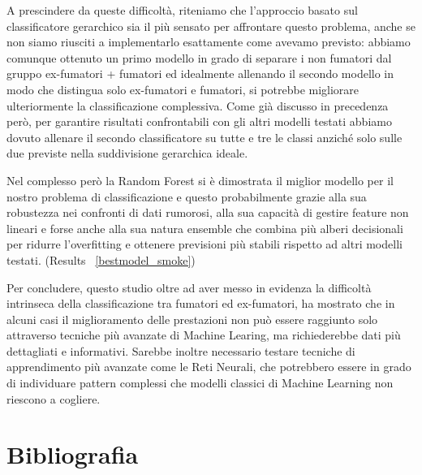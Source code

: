 \documentclass{article}
\begin{document}
\begin{multicols}{2}
A prescindere da queste difficoltà, riteniamo che l’approccio basato sul classificatore gerarchico sia il più sensato per affrontare questo problema, anche se non siamo riusciti a implementarlo esattamente come avevamo previsto: abbiamo comunque ottenuto un primo modello in grado di separare i non fumatori dal gruppo ex-fumatori + fumatori ed idealmente allenando il secondo modello in modo che distingua solo ex-fumatori e fumatori, si potrebbe migliorare ulteriormente la classificazione complessiva.
Come già discusso in precedenza però, per garantire risultati confrontabili con gli altri modelli testati abbiamo dovuto allenare il secondo classificatore su tutte e tre le classi anziché solo sulle due previste nella suddivisione gerarchica ideale.

Nel complesso però la Random Forest si è dimostrata il miglior modello per il nostro problema di classificazione e questo probabilmente grazie alla sua robustezza nei confronti di dati rumorosi, alla sua capacità di gestire feature non lineari e forse anche alla sua natura ensemble che combina più alberi decisionali per ridurre l’overfitting e ottenere previsioni più stabili rispetto ad altri modelli testati. (Results ~\ref{bestmodel_smoke})

Per concludere, questo studio oltre ad aver messo in evidenza la difficoltà intrinseca della classificazione tra fumatori ed ex-fumatori, ha mostrato che in alcuni casi il miglioramento delle prestazioni non può essere raggiunto solo attraverso tecniche più avanzate di Machine Learing, ma richiederebbe dati più dettagliati e informativi.
Sarebbe inoltre necessario testare tecniche di apprendimento più avanzate come le Reti Neurali, che potrebbero essere in grado di individuare pattern complessi che modelli classici di Machine Learning non riescono a cogliere.

\section*{Bibliografia}
\printbibliography[heading=none]

\end{multicols}
\end{document}

